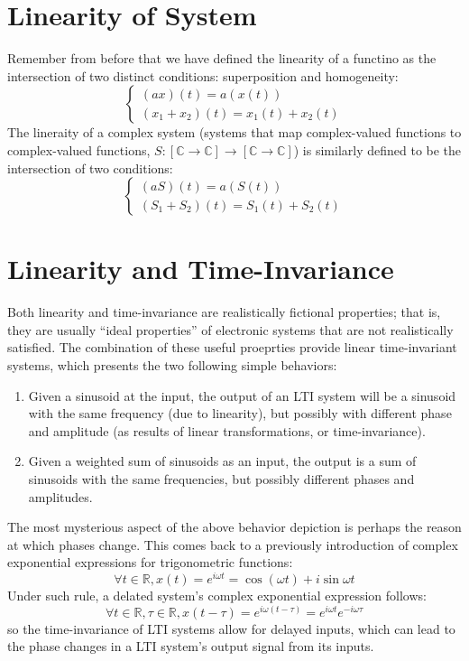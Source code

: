 \section{Linearity of System}
Remember from before that we have defined the linearity of a functino as the intersection of two distinct conditions: superposition and homogeneity:
\[
    \begin{cases}
        (ax)(t) = a(x(t)) \\
        (x_1 + x_2)(t) = x_1(t) + x_2(t)
    \end{cases}
\]
The lineraity of a complex system (systems that map complex-valued functions to complex-valued functions, $S: [\mathbb{C} \rightarrow \mathbb{C}] \rightarrow [\mathbb{C} \rightarrow \mathbb{C}]$) is similarly defined to be the intersection of two conditions:
\[
    \begin{cases}
        (aS)(t) = a(S(t)) \\
        (S_1 + S_2)(t) = S_1(t) + S_2(t)
    \end{cases}
\]

\section{Linearity and Time-Invariance}
Both linearity and time-invariance are realistically fictional properties; that is, they are usually ``ideal properties'' of electronic systems that are not realistically satisfied.
The combination of these useful proeprties provide linear time-invariant systems, which presents the two following simple behaviors:
\begin{enumerate}
    \item Given a sinusoid at the input, the output of an LTI system will be a sinusoid with the same frequency (due to linearity), but possibly with different phase and amplitude (as results of linear transformations, or time-invariance).
    \item Given a weighted sum of sinusoids as an input, the output is a sum of sinusoids with the same frequencies, but possibly different phases and amplitudes.
\end{enumerate}
The most mysterious aspect of the above behavior depiction is perhaps the reason at which phases change. This comes back to a previously introduction of complex exponential expressions for trigonometric functions:
\[
    \forall t \in \mathbb{R}, x(t) = e^{i \omega t} = \cos(\omega t) + i \sin{\omega t}
\]
Under such rule, a delated system's complex exponential expression follows:
\[
    \forall t \in \mathbb{R}, \tau \in \mathbb{R}, x(t - \tau) = e^{i \omega (t - \tau)} = e^{i \omega t} e^{-i \omega \tau}
\]
so the time-invariance of LTI systems allow for delayed inputs, which can lead to the phase changes in a LTI system's output signal from its inputs.

